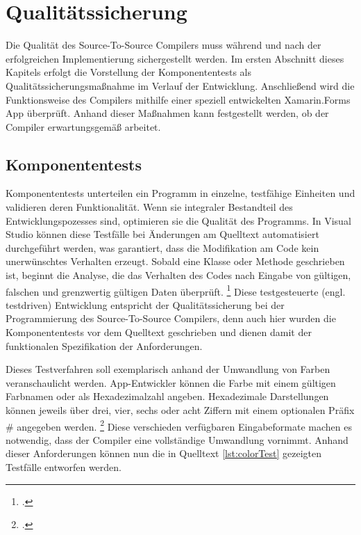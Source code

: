 \chapter{Qualitätssicherung}
\label{chap:Qualitätssicherung}
Die Qualität des Source-To-Source Compilers muss während und nach der erfolgreichen Implementierung sichergestellt werden.  Im ersten Abschnitt dieses Kapitels erfolgt die Vorstellung der Komponententests als Qualitätssicherungsmaßnahme im Verlauf der Entwicklung.  Anschließend wird die Funktionsweise des Compilers mithilfe einer speziell entwickelten Xamarin.Forms App überprüft.  Anhand dieser Maßnahmen kann  festgestellt werden,  ob der Compiler erwartungsgemäß arbeitet. 

\section{Komponententests}
Komponententests unterteilen ein Programm in einzelne,  testfähige Einheiten und validieren deren Funktionalität.  Wenn sie integraler Bestandteil des Entwicklungspozesses sind,  optimieren sie die Qualität des Programms.  In Visual Studio können diese Testfälle bei Änderungen am Quelltext automatisiert durchgeführt werden, was garantiert, dass die Modifikation am Code kein unerwünschtes Verhalten erzeugt.   Sobald eine Klasse oder Methode geschrieben ist, beginnt die Analyse, die das Verhalten des Codes nach Eingabe von gültigen, falschen und grenzwertig gültigen Daten überprüft. \footcite[Vgl.][Abgerufen am \today]{MicrosoftColor}  Diese testgesteuerte (engl. testdriven) Entwicklung entspricht der Qualitätssicherung bei 
der Programmierung des Source-To-Source Compilers, denn auch hier wurden die Komponententests vor dem Quelltext geschrieben und dienen damit  der funktionalen Spezifikation der Anforderungen.

Dieses Testverfahren soll exemplarisch anhand der Umwandlung von Farben veranschaulicht 
werden.
App-Entwickler können die Farbe mit einem gültigen Farbnamen oder als Hexadezimalzahl 
angeben. Hexadezimale Darstellungen können jeweils über drei, vier, sechs oder acht Ziffern mit
einem optionalen Präfix \# angegeben werden.  \footcite[Vgl.][Abgerufen am \today]{MicrosoftColor} 
Diese verschieden verfügbaren Eingabeformate machen es notwendig, dass der Compiler eine 
vollständige Umwandlung vornimmt.  
Anhand dieser Anforderungen können nun die in Quelltext \ref{lst:colorTest} gezeigten Testfälle entworfen werden.



